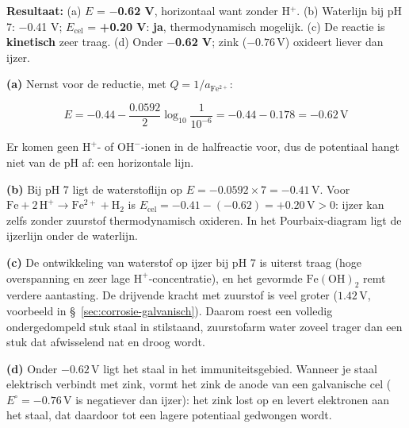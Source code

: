 \begin{oplossing}
\textbf{Resultaat:} (a) \(E\) = \textbf{\ensuremath{-}0.62 V}, horizontaal want zonder H\ensuremath{^{+}}. (b) Waterlijn bij pH 7: \ensuremath{-}0.41 V; \(E_{\text{cel}}\) = \textbf{+0.20 V}: \textbf{ja}, thermodynamisch mogelijk. (c) De reactie is \textbf{kinetisch} zeer traag. (d) Onder \textbf{\ensuremath{-}0.62 V}; zink (\(-0.76\,\mathrm{V}\)) oxideert liever dan ijzer.

\textbf{(a)} Nernst voor de reductie, met \(Q = 1/a_{\mathrm{Fe^{2+}}}\):

\[
E = -0.44 - \frac{0.0592}{2}\log_{10}\frac{1}{10^{-6}} = -0.44 - 0.178 = -0.62\,\mathrm{V}
\]

Er komen geen \(\mathrm{H^+}\)- of \(\mathrm{OH^-}\)-ionen in de halfreactie voor, dus de potentiaal hangt niet van de pH af: een horizontale lijn.

\textbf{(b)} Bij pH 7 ligt de waterstoflijn op \(E = -0.0592 \times 7 = -0.41\,\mathrm{V}\). Voor \(\mathrm{Fe + 2\,H^+ \rightarrow Fe^{2+} + H_2}\) is \(E_{\text{cel}} = -0.41 - (-0.62) = +0.20\,\mathrm{V} > 0\): ijzer kan zelfs zonder zuurstof thermodynamisch oxideren. In het Pourbaix-diagram ligt de ijzerlijn onder de waterlijn.

\textbf{(c)} De ontwikkeling van waterstof op ijzer bij pH 7 is uiterst traag (hoge overspanning en zeer lage \(\mathrm{H^+}\)-concentratie), en het gevormde \(\mathrm{Fe(OH)_2}\) remt verdere aantasting. De drijvende kracht met zuurstof is veel groter (\(1.42\,\mathrm{V}\), voorbeeld in \S~\ref{sec:corrosie-galvanisch}). Daarom roest een volledig ondergedompeld stuk staal in stilstaand, zuurstofarm water zoveel trager dan een stuk dat afwisselend nat en droog wordt.

\textbf{(d)} Onder \(-0.62\,\mathrm{V}\) ligt het staal in het immuniteitsgebied. Wanneer je staal elektrisch verbindt met zink, vormt het zink de anode van een galvanische cel (\(E^\circ = -0.76\,\mathrm{V}\) is negatiever dan ijzer): het zink lost op en levert elektronen aan het staal, dat daardoor tot een lagere potentiaal gedwongen wordt.
\end{oplossing}

